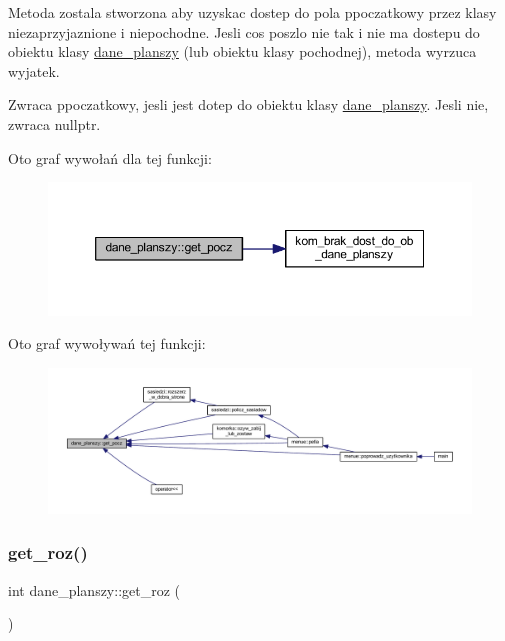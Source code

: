 Metoda zostala stworzona aby uzyskac dostep do pola ppoczatkowy przez klasy niezaprzyjaznione i niepochodne. Jesli cos poszlo nie tak i nie ma dostepu do obiektu klasy \mbox{\hyperlink{classdane__planszy}{dane\+\_\+planszy}} (lub obiektu klasy pochodnej), metoda wyrzuca wyjatek. \begin{DoxyReturn}{Zwraca}
ppoczatkowy, jesli jest dotep do obiektu klasy \mbox{\hyperlink{classdane__planszy}{dane\+\_\+planszy}}. Jesli nie, zwraca nullptr. 
\end{DoxyReturn}
Oto graf wywołań dla tej funkcji\+:
\nopagebreak
\begin{figure}[H]
\begin{center}
\leavevmode
\includegraphics[width=350pt]{classdane__planszy_a1b6f7b4b0a06da4407bea609c48441ce_cgraph}
\end{center}
\end{figure}
Oto graf wywoływań tej funkcji\+:
\nopagebreak
\begin{figure}[H]
\begin{center}
\leavevmode
\includegraphics[width=350pt]{classdane__planszy_a1b6f7b4b0a06da4407bea609c48441ce_icgraph}
\end{center}
\end{figure}
\mbox{\label{classdane__planszy_a67238befe224aca22577d787df2dffa9}} 
\subsubsection{\texorpdfstring{get\+\_\+roz()}{get\_roz()}}
{\footnotesize\ttfamily int dane\+\_\+planszy\+::get\+\_\+roz (\begin{DoxyParamCaption}{ }\end{DoxyParamCaption})}

